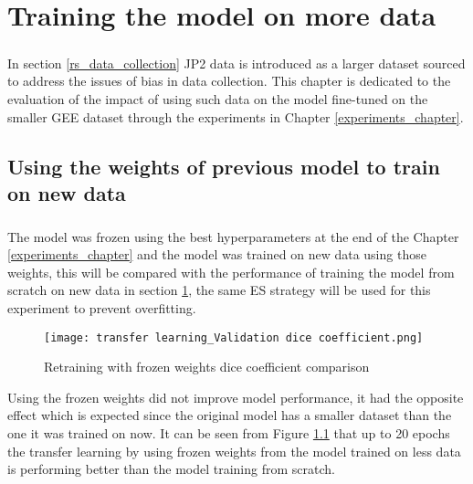 \chapter{Training the model on more data} \label{new_data_train}
\paragraph{}
In section \ref{rs_data_collection} JP2 data is introduced as a larger dataset sourced to address the issues of bias in data collection. This chapter is dedicated to the evaluation of the impact of using such data on the model fine-tuned on the smaller GEE dataset through the experiments in Chapter \ref{experiments_chapter}.

\section{Using the weights of previous model to train on new data}
\paragraph{}
The model was frozen using the best hyperparameters at the end of the Chapter \ref{experiments_chapter} and the model was trained on new data using those weights, this will be compared with the performance of training the model from scratch on new data in section \ref{new_data_train}, the same ES strategy will be used for this experiment to prevent overfitting.

\begin{figure}[hbt!]
    \centering
    \texttt{[image: transfer learning\_Validation dice coefficient.png]}
    \caption{Retraining with frozen weights dice coefficient comparison}
    \label{rt_dice}
\end{figure}

Using the frozen weights did not improve model performance, it had the opposite effect which is expected since the original model has a smaller dataset than the one it was trained on now. It can be seen from Figure \ref{rt_dice} that up to 20 epochs the transfer learning by using frozen weights from the model trained on less data is performing better than the model training from scratch. 

